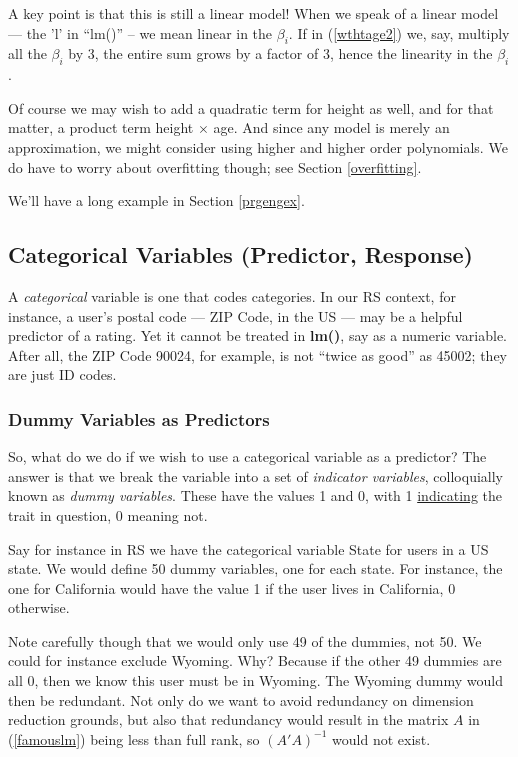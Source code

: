 A key point is that this is still a linear model! When we speak of a
linear model --- the 'l' in ``lm()'' -- we mean linear in the $\beta_i$.
If in (\ref{wthtage2}) we, say, multiply all the $\beta_i$ by 3, the
entire sum grows by a factor of 3, hence the linearity in the $\beta_i$.

Of course we may wish to add a quadratic term for height as well, and
for that matter, a product term height $\times$ age.  And since any
model is merely an approximation, we might consider using higher and
higher order polynomials.  We do have to worry about overfitting though;
see Section \ref{overfitting}.

We'll have a long example in Section \ref{prgengex}.

\subsection{Categorical Variables (Predictor, Response)}

A \textit{categorical} variable is one that codes categories.  In our RS
context, for instance, a user's postal code --- ZIP Code, in the US ---
may be a helpful predictor of a rating.  Yet it cannot be treated in
\textbf{lm()}, say as a numeric variable.  After all, the ZIP Code
90024, for example, is not ``twice as good'' as 45002; they are just ID
codes.

\subsubsection{Dummy Variables as Predictors}

So, what do we do if we wish to use a categorical variable as a
predictor?  The answer is that we break the variable into a set of
\textit{indicator variables}, colloquially known as \textit{dummy
variables}.  These have the values 1 and 0, with 1
\underline{indicating} the trait in question, 0 meaning not.

Say for instance in RS we have the categorical variable State for users
in a US state.  We would define 50 dummy variables, one for each state.
For instance, the one for California would have the value 1 if the user
lives in California, 0 otherwise.

Note carefully though that we would only use 49 of the dummies, not 50.
We could for instance exclude Wyoming.  Why? Because if the other 49
dummies are all 0, then we know this user must be in Wyoming.  The
Wyoming dummy would then be redundant. Not only do we want to avoid
redundancy on dimension reduction grounds, but also that redundancy
would result in the matrix $A$ in (\ref{famouslm}) being less than full
rank, so $(A'A)^{-1}$ would not exist.

